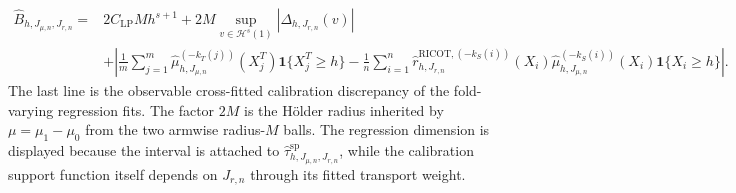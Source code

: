 \[
\begin{aligned}
\widehat B_{h,J_{\mu,n},J_{r,n}}={}&2C_{\mathrm{LP}}Mh^{s+1}+2M\sup_{v\in\mathcal H^s(1)}|\Delta_{h,J_{r,n}}(v)|\\
&+\left|\frac1m\sum_{j=1}^m\widehat\mu_{h,J_{\mu,n}}^{(-k_T(j))}(X_j^T)\mathbf 1\{X_j^T\ge h\}
-\frac1n\sum_{i=1}^n\widehat r^{\mathrm{RICOT},(-k_S(i))}_{h,J_{r,n}}(X_i)\widehat\mu_{h,J_{\mu,n}}^{(-k_S(i))}(X_i)\mathbf 1\{X_i\ge h\}\right|.
\end{aligned}
\]
The last line is the observable cross-fitted calibration discrepancy of the fold-varying regression fits. The factor \(2M\) is the Hölder radius inherited by \(\mu=\mu_1-\mu_0\) from the two armwise radius-\(M\) balls. The regression dimension is displayed because the interval is attached to \(\widehat\tau^{\mathrm{sp}}_{h,J_{\mu,n},J_{r,n}}\), while the calibration support function itself depends on \(J_{r,n}\) through its fitted transport weight.